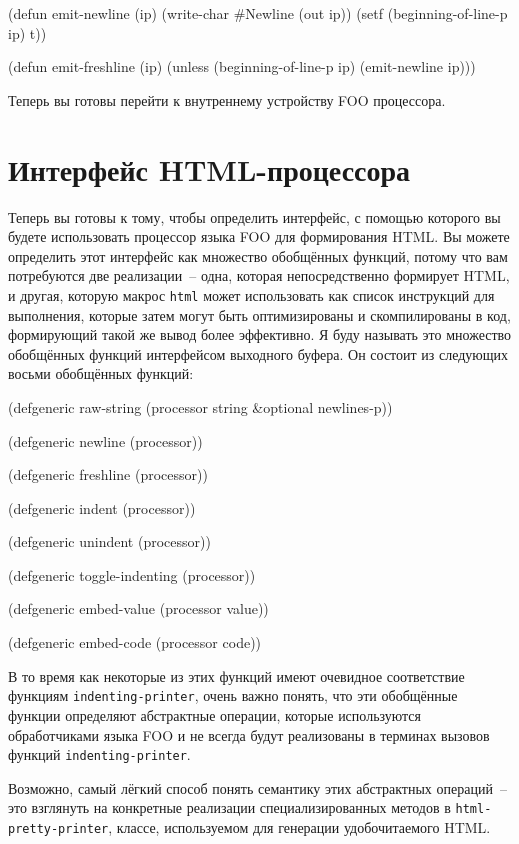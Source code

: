 \begin{myverb}
(defun emit-newline (ip)
  (write-char #\bslash{}Newline (out ip))
  (setf (beginning-of-line-p ip) t))

(defun emit-freshline (ip)
  (unless (beginning-of-line-p ip) (emit-newline ip)))
\end{myverb}

Теперь вы готовы перейти к внутреннему устройству FOO процессора. 

\section{Интерфейс HTML-процессора}

Теперь вы готовы к тому, чтобы определить интерфейс, с помощью которого вы будете
использовать процессор языка FOO для формирования HTML. Вы можете определить этот
интерфейс как множество обобщённых функций, потому что вам потребуются две реализации~--
одна, которая непосредственно формирует HTML, и другая, которую макрос \lstinline{html} может
использовать как список инструкций для выполнения, которые затем могут быть оптимизированы
и скомпилированы в код, формирующий такой же вывод более эффективно. Я буду называть это
множество обобщённых функций интерфейсом выходного буфера. Он состоит из следующих восьми
обобщённых функций:

\begin{myverb}
(defgeneric raw-string (processor string &optional newlines-p))

(defgeneric newline (processor))

(defgeneric freshline (processor))

(defgeneric indent (processor))

(defgeneric unindent (processor))

(defgeneric toggle-indenting (processor))

(defgeneric embed-value (processor value))

(defgeneric embed-code (processor code))
\end{myverb}

В то время как некоторые из этих функций имеют очевидное соответствие функциям
\lstinline{indenting-printer}, очень важно понять, что эти обобщённые функции определяют
абстрактные операции, которые используются обработчиками языка FOO и не всегда будут
реализованы в терминах вызовов функций \lstinline{indenting-printer}.

Возможно, самый лёгкий способ понять семантику этих абстрактных операций~-- это взглянуть на
конкретные реализации специализированных методов в \lstinline{html-pretty-printer}, классе,
используемом для генерации удобочитаемого HTML.

